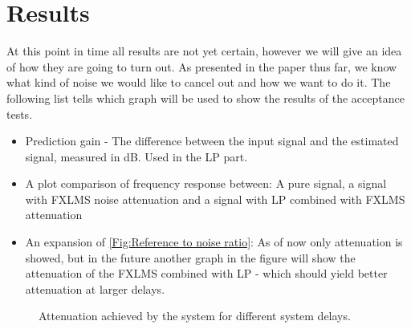 \section*{Results}

At this point in time all results are not yet certain, however we will give an idea of how they are going to turn out.
As presented in the paper thus far, we know what kind of noise we would like to cancel out and how we want to do it. The following list tells which graph will be used to show the results of the acceptance tests.

\begin{itemize}
\item Prediction gain - The difference between the input signal and the estimated signal, measured in dB. Used in the LP part.
\item A plot comparison of frequency response between: A pure signal, a signal with FXLMS noise attenuation and a signal with LP combined with FXLMS attenuation
\item An expansion of \autoref{Fig:Reference to noise ratio}: As of now only attenuation is showed, but in the future another graph in the figure will show the attenuation of the FXLMS combined with LP - which should yield better attenuation at larger delays.

\end{itemize}


\begin{figure}[H]
	\centering
	
	\caption{Attenuation achieved by the system for different system delays.}
	\label{Fig:Reference to noise ratio}
\end{figure}


